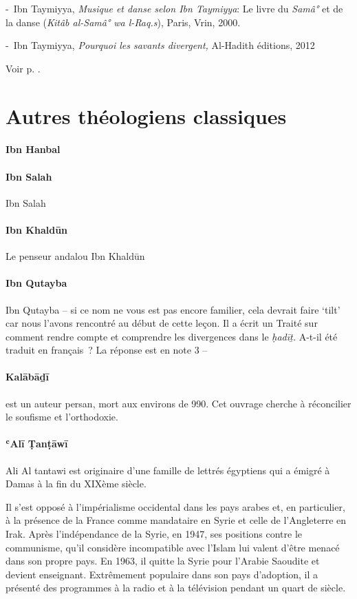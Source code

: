 -~Ibn Taymiyya, \emph{Musique et danse selon Ibn Taymiyya}: Le livre du
\emph{Samâ°} et de la danse (\emph{Kitâb al-Samâ° wa l-Raq.s}), Paris,
Vrin, 2000.

-~Ibn Taymiyya, \emph{Pourquoi les savants divergent,} Al-Hadith
éditions, 2012


Voir p. \pageref{ibn-taymiyya}.

\section{Autres théologiens classiques}
\paragraph{Ibn Hanbal}

\pageref{Theol:IbnHanbal1}

\paragraph{Ibn Salah}
Ibn Salah
\pageref{Ibnsalah1}

\paragraph{Ibn Khaldūn}
Le penseur andalou Ibn Khaldūn \pageref{theol:IbnKhaldun} 

\paragraph{Ibn Qutayba}
Ibn Qutayba -- si ce nom ne vous est pas encore familier, cela devrait
faire `tilt' car nous l'avons rencontré au début de cette leçon. Il a
écrit un Traité sur comment rendre compte et comprendre les divergences
dans le \emph{ḥadīṯ.} A-t-il été traduit en français~? La réponse est en
note 3 --
\pageref{Theol:IbnQutayba1}

\paragraph{Kalābāḏī}
  est un auteur persan, mort aux environs de 990. Cet ouvrage
cherche à réconcilier le soufisme et l'orthodoxie. 
\pageref{theol:Kalabadi}


\paragraph{ʿAlī Ṭanṭāwī} \label{theo:AliAlTawani}
{Ali Al tantawi est originaire d'une
famille de lettrés égyptiens qui a émigré à Damas à la fin du XIXème
siècle.


Il s'est opposé à l'impérialisme occidental dans les pays
arabes et, en particulier, à la présence de la France comme mandataire
en Syrie et celle de l'Angleterre en Irak. Après l'indépendance de la
Syrie, en 1947, ses positions contre le communisme, qu'il considère
incompatible avec l'Islam lui valent d'être menacé dans son propre pays.
En 1963, il quitte la Syrie pour l'Arabie Saoudite et devient
enseignant.
Extrêmement populaire dans son pays d'adoption, il a
présenté des programmes à la radio et à la télévision pendant un quart
de
siècle.}


